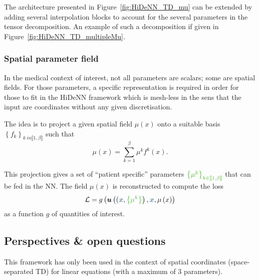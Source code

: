 \documentclass{article}
\begin{document}
The architecture presented in Figure~\ref{fig:HiDeNN_TD_mu} can be extended by adding several interpolation blocks to account for the several parameters in the tensor decomposition. An example of such a decomposition if given in Figure~\ref{fig:HiDeNN_TD_multipleMu}.

\subsubsection{Spatial parameter field}

In the medical context of interest, not all parameters are scalars; some are spatial fields. For those parameters, a specific representation is required in order for those to fit in the HiDeNN framework which is mesh-less in the sens that the input are coordinates without any given discretisation. 

The idea is to project a given spatial field $\mu\left(x\right)$ onto a suitable basis $\left\{f_k\right\}_{k \ in \llbracket 1, \beta \rrbracket}$ such that 
\begin{equation}
    \mu\left(x\right) = \sum\limits_{k=1}^{\beta}\mu^{k}f^k\left(x\right).
\end{equation}

This projection gives a set of ``patient specific'' parameters $\textcolor{LGreenLMS}{\left\{\mu^k\right\}_{k \in \llbracket 1, \beta \rrbracket}}$ that can be fed in the NN. The field $\mu\left(x\right)$ is reconstructed to compute the loss 
\begin{equation}
\mathcal{L} = g\left(\vect{u}\left((\textcolor{BleuLMS!70}{\vect{x}},\textcolor{LGreenLMS}{\left\{\mu^k\right\}}\right),\textcolor{BleuLMS!70}{\vect{x}},\mu\left(x\right)\right)
\end{equation}
as a function $g$ of quantities of interest.

\subsection{Perspectives \& open questions}

This framework has only been used in the context of spatial coordinates (space-separated TD) for linear equations (with a maximum of 3 parameters). 
\end{document}
